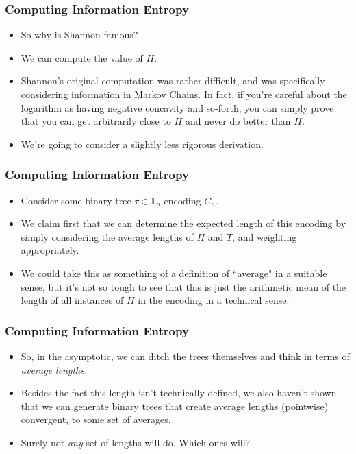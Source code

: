 \documentclass[xcolor=dvipsnames]{beamer}
\begin{document}
	
	\begin{frame}
	\frametitle{Computing Information Entropy}
	    \begin{itemize}
	        \item So why is Shannon famous?
	        \pause
	        \item We can compute the value of $H$.
	        \pause
	        \item Shannon's original computation was rather difficult, and was specifically considering information in Markov Chains. In fact, if you're careful about the logarithm as having negative concavity and so-forth, you can simply prove that you can get arbitrarily close to $H$ and never do better than $H$.
	        \pause
	        \item We're going to consider a slightly less rigorous derivation. 
	    \end{itemize}
	\end{frame}
	
	\begin{frame}
	\frametitle{Computing Information Entropy}
	\begin{itemize}
	    \item Consider some binary tree $\tau \in \mathbb{T}_n$ encoding $C_n$. 
	    \pause
	    \item We claim first that we can determine the expected length of this encoding by simply considering the average lengths of $H$ and $T$, and weighting appropriately. 
	    \pause
	    \item We could take this as something of a definition of ``average" in a suitable sense, but it's not so tough to see that this is just the arithmetic mean of the length of all instances of $H$ in the encoding in a technical sense.  
	    \pause
	\end{itemize}
	\end{frame}
	
	\begin{frame}
	\frametitle{Computing Information Entropy}
	    \begin{itemize}
	    \item So, in the asymptotic, we can ditch the trees themselves and think in terms of \textit{average lengths.}
	    \pause
	    \item Besides the fact this length isn't technically defined, we also haven't shown that we can generate binary trees that create average lengths (pointwise) convergent, to some set of averages. 
	    \pause
	    \item Surely not \textit{any} set of lengths will do. Which ones will?
		\end{itemize}
	\end{frame}
	
\end{document}
